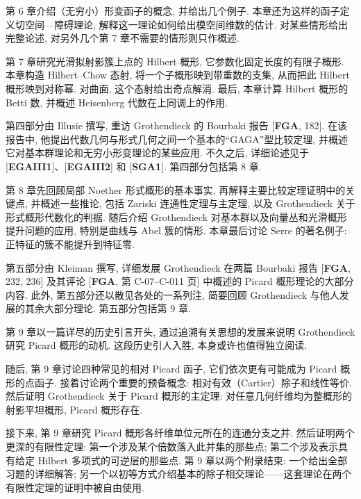 第 6 章介绍（无穷小）形变函子的概念, 并给出几个例子. 本章还为这样的函子定义切空间—障碍理论, 解释这一理论如何给出模空间维数的估计. 对某些情形给出完整论述, 对另外几个第 7 章不需要的情形则只作概述.

第 7 章研究光滑拟射影簇上点的 Hilbert 概形, 它参数化固定长度的有限子概形. 本章构造 Hilbert--Chow 态射, 将一个子概形映到带重数的支集, 从而把此 Hilbert 概形映到对称幂. 对曲面, 这个态射给出奇点解消. 最后, 本章计算 Hilbert 概形的 Betti 数, 并概述 Heisenberg 代数在上同调上的作用.

第四部分由 Illusie 撰写, 重访 Grothendieck 的 Bourbaki 报告 [\textbf{FGA}, 182]. 在该报告中, 他提出代数几何与形式几何之间一个基本的“GAGA”型比较定理, 并概述它对基本群理论和无穷小形变理论的某些应用. 不久之后, 详细论述见于 [\textbf{EGAIII1}]、[\textbf{EGAIII2}] 和 [\textbf{SGA1}]. 第四部分包括第 8 章.

第 8 章先回顾局部 Noether 形式概形的基本事实, 再解释主要比较定理证明中的关键点, 并概述一些推论, 包括 Zariski 连通性定理与主定理, 以及 Grothendieck 关于形式概形代数化的判据. 随后介绍 Grothendieck 对基本群以及向量丛和光滑概形提升问题的应用, 特别是曲线与 Abel 簇的情形. 本章最后讨论 Serre 的著名例子: 正特征的簇不能提升到特征零.

第五部分由 Kleiman 撰写, 详细发展 Grothendieck 在两篇 Bourbaki 报告 [\textbf{FGA}, 232, 236] 及其评论 [\textbf{FGA}, 第 C-07--C-011 页] 中概述的 Picard 概形理论的大部分内容. 此外, 第五部分还以散见各处的一系列注, 简要回顾 Grothendieck 与他人发展的其余大部分理论. 第五部分包括第 9 章.

第 9 章以一篇详尽的历史引言开头, 通过追溯有关思想的发展来说明 Grothendieck 研究 Picard 概形的动机. 这段历史引人入胜, 本身或许也值得独立阅读.

随后, 第 9 章讨论四种常见的相对 Picard 函子, 它们依次更有可能成为 Picard 概形的点函子. 接着讨论两个重要的预备概念: 相对有效（Cartier）除子和线性等价. 然后证明 Grothendieck 关于 Picard 概形的主定理: 对任意几何纤维均为整概形的射影平坦概形, Picard 概形存在.

接下来, 第 9 章研究 Picard 概形各纤维单位元所在的连通分支之并. 然后证明两个更深的有限性定理: 第一个涉及某个倍数落入此并集的那些点; 第二个涉及表示具有给定 Hilbert 多项式的可逆层的那些点. 第 9 章以两个附录结束: 一个给出全部习题的详细解答; 另一个以初等方式介绍基本的除子相交理论——这套理论在两个有限性定理的证明中被自由使用.

